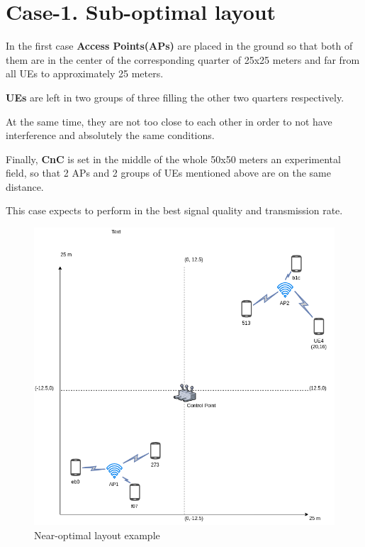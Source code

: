 \hypertarget{case-1.-sub-optimal-layout}{%
\section{Case-1. Sub-optimal layout}\label{case-1.-sub-optimal-layout}}

In the first case \textbf{Access Points(APs)} are placed in the ground
so that both of them are in the center of the corresponding quarter of
25x25 meters and far from all UEs to approximately 25 meters.

\textbf{UEs} are left in two groups of three filling the other two
quarters respectively.

At the same time, they are not too close to each other in order to not
have interference and absolutely the same conditions.

Finally, \textbf{CnC} is set in the middle of the whole 50x50 meters an
experimental field, so that 2 APs and 2 groups of UEs mentioned above
are on the same distance.

This case expects to perform in the best signal quality and transmission
rate.

\begin{figure}[H]
	\centering
	\includegraphics[width=\linewidth,keepaspectratio]{images/05-cases-description-Exp4-Suboptimal.png}
\caption{Near-optimal layout example}
\end{figure}
